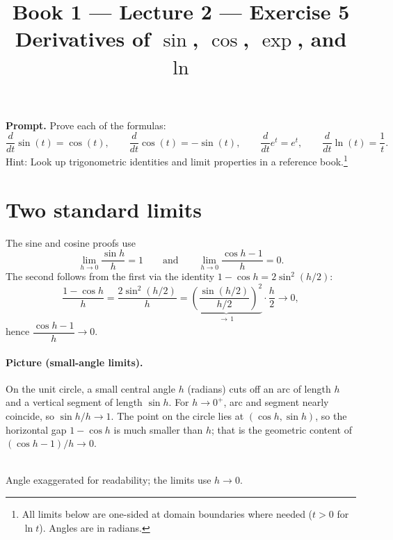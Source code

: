 \documentclass[11pt]{article}
\title{\textbf{Book 1 --- Lecture 2 --- Exercise 5}\\[2mm]
\large Derivatives of \(\sin\), \(\cos\), \(\exp\), and \(\ln\)}
\author{}
\date{}
\newcommand{\promptbox}[1]{%
  \begin{savenotes}%
  \begingroup\setlength{\fboxsep}{10pt}\noindent
  \colorbox{blue!8}{\parbox{\dimexpr\linewidth-2\fboxsep\relax}{\textbf{Prompt. }#1}}
  \endgroup
  \end{savenotes}%
}
\begin{document}
\maketitle

\promptbox{Prove each of the formulas:
\[
\frac{d}{dt}\sin(t)=\cos(t),\qquad
\frac{d}{dt}\cos(t)=-\sin(t),\qquad
\frac{d}{dt}e^{t}=e^{t},\qquad
\frac{d}{dt}\ln(t)=\frac{1}{t}.
\]
Hint: Look up trigonometric identities and limit properties in a reference
book.\footnote{All limits below are one-sided at domain boundaries where needed
(\(t>0\) for \(\ln t\)). Angles are in radians.}}

\section*{Two standard limits}
The sine and cosine proofs use
\[
\lim_{h\to 0}\frac{\sin h}{h}=1
\qquad\text{and}\qquad
\lim_{h\to 0}\frac{\cos h-1}{h}=0.
\]
The second follows from the first via the identity \(1-\cos h=2\sin^2(h/2)\):
\[
\frac{1-\cos h}{h}
=\frac{2\sin^2(h/2)}{h}
=\underbrace{\left(\frac{\sin(h/2)}{h/2}\right)^2}_{\to\,1}\cdot\frac{h}{2}\to 0,
\]
hence \(\dfrac{\cos h-1}{h}\to 0\).

\paragraph{Picture (small-angle limits).}
On the unit circle, a small central angle \(h\) (radians) cuts off an arc of length
\(h\) and a vertical segment of length \(\sin h\). For \(h\to 0^{+}\), arc and
segment nearly coincide, so \(\sin h/h\to 1\). The point on the circle lies at
\((\cos h,\sin h)\), so the horizontal gap \(1-\cos h\) is much smaller than \(h\);
that is the geometric content of \((\cos h-1)/h\to 0\).

\begin{center}
\\[0.5em]
{\small Angle exaggerated for readability; the limits use \(h\to 0\).}
\end{center}
\end{document}
